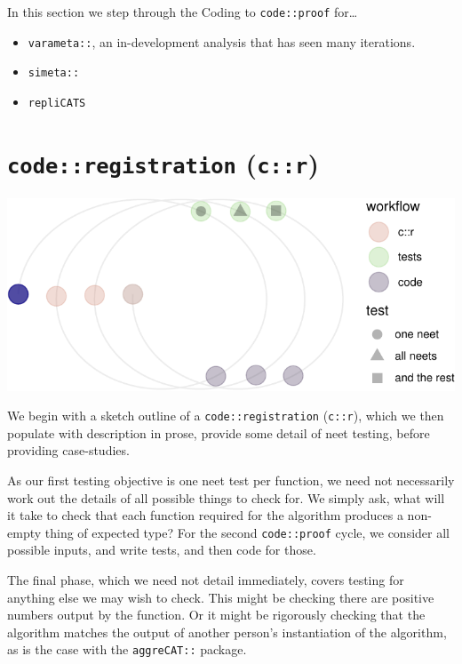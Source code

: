 \documentclass[
]{article}
\providecommand{\tightlist}{%
  \setlength{\itemsep}{0pt}\setlength{\parskip}{0pt}}
\begin{document}
In this section we step through the Coding to \texttt{code::proof} for\ldots{}

\begin{itemize}
\tightlist
\item
  \texttt{varameta::}, an in-development analysis that has seen many iterations.\\
\item
  \texttt{simeta::}
\item
  \texttt{repliCATS}
\end{itemize}

\hypertarget{coderegistration-cr}{%
\section{\texorpdfstring{\texttt{code::registration} (\texttt{c::r})}{code::registration (c::r)}}\label{coderegistration-cr}}

\begin{center}\includegraphics{when-is-done-done_files/figure-latex/unnamed-chunk-4-1} \end{center}

We begin with a sketch outline of a \texttt{code::registration} (\texttt{c::r}), which we then populate with description in prose, provide some detail of neet testing, before providing case-studies.

As our first testing objective is one neet test per function, we need not necessarily work out the details of all possible things to check for. We simply ask, what will it take to check that each function required for the algorithm produces a non-empty thing of expected type? For the second \texttt{code::proof} cycle, we consider all possible inputs, and write tests, and then code for those.

The final phase, which we need not detail immediately, covers testing for anything else we may wish to check. This might be checking there are positive numbers output by the function. Or it might be rigorously checking that the algorithm matches the output of another person's instantiation of the algorithm, as is the case with the \texttt{aggreCAT::} package.
\end{document}
